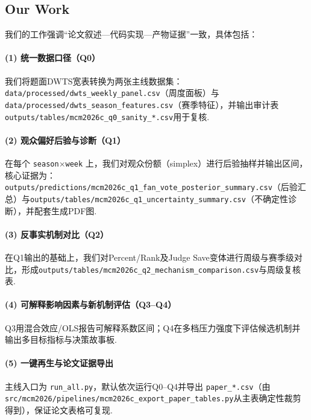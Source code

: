 \subsection{Our Work}

我们的工作强调“论文叙述---代码实现---产物证据”一致，具体包括：

\paragraph{(1) 统一数据口径（Q0）}
我们将题面DWTS宽表转换为两张主线数据集：
\texttt{data/processed/dwts\_weekly\_panel.csv}（周度面板）与\texttt{data/processed/dwts\_season\_features.csv}（赛季特征），并输出审计表\texttt{outputs/tables/mcm2026c\_q0\_sanity\_*.csv}用于复核.

\paragraph{(2) 观众偏好后验与诊断（Q1）}
在每个 \texttt{season$\times$week} 上，我们对观众份额（simplex）进行后验抽样并输出区间，核心证据为：
\texttt{outputs/predictions/mcm2026c\_q1\_fan\_vote\_posterior\_summary.csv}（后验汇总）与\texttt{outputs/tables/mcm2026c\_q1\_uncertainty\_summary.csv}（不确定性诊断），并配套生成PDF图.

\paragraph{(3) 反事实机制对比（Q2）}
在Q1输出的基础上，我们对Percent/Rank及Judge Save变体进行周级与赛季级对比，形成\texttt{outputs/tables/mcm2026c\_q2\_mechanism\_comparison.csv}与周级复核表.

\paragraph{(4) 可解释影响因素与新机制评估（Q3--Q4）}
Q3用混合效应/OLS报告可解释系数区间；Q4在多档压力强度下评估候选机制并输出多目标指标与决策故事板.

\paragraph{(5) 一键再生与论文证据导出}
主线入口为 \texttt{run\_all.py}，默认依次运行Q0--Q4并导出 \texttt{paper\_*.csv}（由 \texttt{src/mcm2026/pipelines/mcm2026c\_export\_paper\_tables.py}从主表确定性裁剪得到），保证论文表格可复现.

